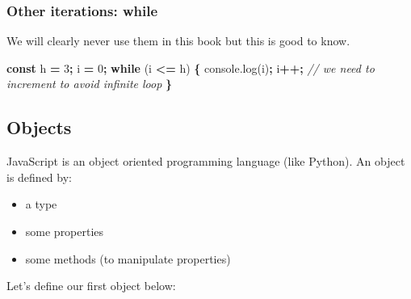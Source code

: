 \documentclass[]{book}
\newenvironment{Shaded}{\begin{snugshade}}{\end{snugshade}}
\newcommand{\AttributeTok}[1]{\textcolor[rgb]{0.77,0.63,0.00}{#1}}
\newcommand{\CommentTok}[1]{\textcolor[rgb]{0.56,0.35,0.01}{\textit{#1}}}
\newcommand{\ControlFlowTok}[1]{\textcolor[rgb]{0.13,0.29,0.53}{\textbf{#1}}}
\newcommand{\DecValTok}[1]{\textcolor[rgb]{0.00,0.00,0.81}{#1}}
\newcommand{\KeywordTok}[1]{\textcolor[rgb]{0.13,0.29,0.53}{\textbf{#1}}}
\newcommand{\NormalTok}[1]{#1}
\newcommand{\OperatorTok}[1]{\textcolor[rgb]{0.81,0.36,0.00}{\textbf{#1}}}
\newcommand{\VariableTok}[1]{\textcolor[rgb]{0.00,0.00,0.00}{#1}}
\providecommand{\tightlist}{%
  \setlength{\itemsep}{0pt}\setlength{\parskip}{0pt}}
\begin{document}
\hypertarget{other-iterations-while}{%
\subsubsection{Other iterations: while}\label{other-iterations-while}}

We will clearly never use them in this book but this is good to know.

\begin{Shaded}
\begin{Highlighting}[]
\KeywordTok{const}\NormalTok{ h }\OperatorTok{=} \DecValTok{3}\OperatorTok{;}\NormalTok{ i }\OperatorTok{=} \DecValTok{0}\OperatorTok{;}
\ControlFlowTok{while}\NormalTok{ (i }\OperatorTok{<=}\NormalTok{ h) }\OperatorTok{\{}
  \VariableTok{console}\NormalTok{.}\AttributeTok{log}\NormalTok{(i)}\OperatorTok{;}
\NormalTok{  i}\OperatorTok{++;} \CommentTok{// we need to increment to avoid infinite loop}
\OperatorTok{\}}
\end{Highlighting}
\end{Shaded}

\hypertarget{objects}{%
\subsection{Objects}\label{objects}}

JavaScript is an object oriented programming language (like Python). An object is defined by:

\begin{itemize}
\tightlist
\item
  a type
\item
  some properties
\item
  some methods (to manipulate properties)
\end{itemize}

Let's define our first object below:
\end{document}
